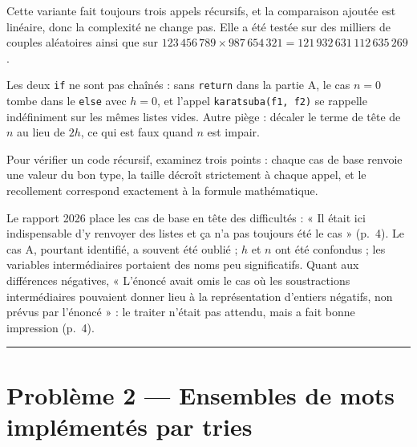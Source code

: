 \documentclass[11pt,a4paper]{article}
\begin{document}
Cette variante fait toujours trois appels récursifs, et la comparaison ajoutée est linéaire, donc la complexité ne change pas. Elle a été testée sur des milliers de couples aléatoires ainsi que sur \(123\,456\,789 \times 987\,654\,321 = 121\,932\,631\,112\,635\,269\).

\begin{piege}

Les deux \texttt{if} ne sont pas chaînés : sans \texttt{return} dans la partie A, le cas \(n = 0\) tombe dans le \texttt{else} avec \(h = 0\), et l'appel \texttt{karatsuba(\allowbreak{}f1,\allowbreak{}\ f2)\allowbreak{}} se rappelle indéfiniment sur les mêmes listes vides. Autre piège : décaler le terme de tête de \(n\) au lieu de \(2h\), ce qui est faux quand \(n\) est impair.

\end{piege}

\begin{methode}

Pour vérifier un code récursif, examinez trois points : chaque cas de base renvoie une valeur du bon type, la taille décroît strictement à chaque appel, et le recollement correspond exactement à la formule mathématique.

\end{methode}

\begin{jury}

Le rapport 2026 place les cas de base en tête des difficultés : « Il était ici indispensable d'y renvoyer des listes et ça n'a pas toujours été le cas » (p.~4). Le cas A, pourtant identifié, a souvent été oublié ; \(h\) et \(n\) ont été confondus ; les variables intermédiaires portaient des noms peu significatifs. Quant aux différences négatives, « L'énoncé avait omis le cas où les soustractions intermédiaires pouvaient donner lieu à la représentation d'entiers négatifs, non prévus par l'énoncé » : le traiter n'était pas attendu, mais a fait bonne impression (p.~4).

\end{jury}

\begin{center}\rule{0.5\linewidth}{0.5pt}\end{center}

\hypertarget{probluxe8me-2-ensembles-de-mots-impluxe9mentuxe9s-par-tries}{%
\section{Problème 2 --- Ensembles de mots implémentés par tries}\label{probluxe8me-2-ensembles-de-mots-impluxe9mentuxe9s-par-tries}}
\end{document}

